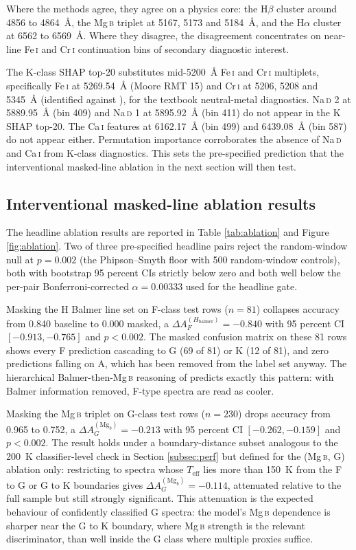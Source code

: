 \documentclass[11pt,a4paper]{article}
\newcommand{\Halpha}{H$\alpha$\xspace}
\newcommand{\Hbeta}{H$\beta$\xspace}
\newcommand{\Mgb}{Mg\,\textsc{b}\xspace}
\newcommand{\NaD}{Na\,\textsc{d}\xspace}
\newcommand{\CaI}{Ca\,\textsc{i}\xspace}
\newcommand{\FeI}{Fe\,\textsc{i}\xspace}
\newcommand{\CrI}{Cr\,\textsc{i}\xspace}
\newcommand{\Teff}{$T_{\mathrm{eff}}$\xspace}
\newcommand{\dA}{\Delta A}
\begin{document}
Where the methods agree, they agree on a physics core: the \Hbeta cluster around 4856 to 4864~\AA{}, the \Mgb triplet at 5167, 5173 and 5184~\AA{}, and the \Halpha cluster at 6562 to 6569~\AA{}. Where they disagree, the disagreement concentrates on near-line \FeI and \CrI continuation bins of secondary diagnostic interest.

The K-class SHAP top-20 substitutes mid-5200~\AA{} \FeI and \CrI multiplets, specifically \FeI at 5269.54~\AA{} (Moore RMT 15) and \CrI at 5206, 5208 and 5345~\AA{} (identified against \citet{GrayCorbally2009}), for the textbook neutral-metal diagnostics. \NaD2 at 5889.95~\AA{} (bin 409) and \NaD1 at 5895.92~\AA{} (bin 411) do not appear in the K SHAP top-20. The \CaI features at 6162.17~\AA{} (bin 499) and 6439.08~\AA{} (bin 587) do not appear either. Permutation importance corroborates the absence of \NaD and \CaI from K-class diagnostics. This sets the pre-specified prediction that the interventional masked-line ablation in the next section will then test.

\subsection{Interventional masked-line ablation results}
\label{subsec:results-ablation}

The headline ablation results are reported in Table \ref{tab:ablation} and Figure \ref{fig:ablation}. Two of three pre-specified headline pairs reject the random-window null at $p = 0.002$ (the Phipson--Smyth floor with 500 random-window controls), both with bootstrap 95 percent CIs strictly below zero and both well below the per-pair Bonferroni-corrected $\alpha = 0.00333$ used for the headline gate.

Masking the H Balmer line set on F-class test rows ($n = 81$) collapses accuracy from 0.840 baseline to 0.000 masked, a $\dA_F^{(H_{\mathrm{balmer}})} = -0.840$ with 95 percent CI $[-0.913, -0.765]$ and $p < 0.002$. The masked confusion matrix on these 81 rows shows every F prediction cascading to G (69 of 81) or K (12 of 81), and zero predictions falling on A, which has been removed from the label set anyway. The hierarchical Balmer-then-\Mgb reasoning of \citet{GrayCorbally2009} predicts exactly this pattern: with Balmer information removed, F-type spectra are read as cooler.

Masking the \Mgb triplet on G-class test rows ($n = 230$) drops accuracy from 0.965 to 0.752, a $\dA_G^{(\mathrm{Mg}_b)} = -0.213$ with 95 percent CI $[-0.262, -0.159]$ and $p < 0.002$. The result holds under a boundary-distance subset analogous to the 200~K classifier-level check in Section \ref{subsec:perf} but defined for the (\Mgb, G) ablation only: restricting to spectra whose \Teff lies more than 150~K from the F to G or G to K boundaries gives $\dA_G^{(\mathrm{Mg}_b)} = -0.114$, attenuated relative to the full sample but still strongly significant. This attenuation is the expected behaviour of confidently classified G spectra: the model's \Mgb dependence is sharper near the G to K boundary, where \Mgb strength is the relevant discriminator, than well inside the G class where multiple proxies suffice.
\end{document}
